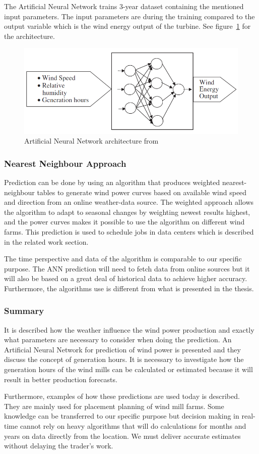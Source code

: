 The Artificial Neural Network trains 3-year dataset containing the mentioned input parameters. The input parameters are during the training compared to the output variable which is the wind energy output of the turbine. See figure~\ref{fig:annArchitecture} for the architecture.
\\[0.5cm]
\begin{figure}[h!]
\centering
\includegraphics[width=0.7\linewidth,natwidth=898,natheight=587]{billeder/ANNwindSpeedPrediction.png}
\caption{Artificial Neural Network architecture from \cite{WindPowerGenerationUsingANN}}
\label{fig:annArchitecture}
\end{figure}

\subsubsection{Nearest Neighbour Approach}
Prediction can be done by using an algorithm that produces weighted nearest-neighbour tables to generate wind power curves based on available wind speed and direction from an online weather-data source. The weighted approach allows the algorithm to adapt to seasonal changes by weighting newest results highest, and the power curves makes it possible to use the algorithm on different wind farms. This prediction is used to schedule jobs in data centers which is described in the related work section.

The time perspective and data of the algorithm is comparable to our specific purpose. The ANN prediction will need to fetch data from online sources but it will also be based on a great deal of historical data to achieve higher accuracy. Furthermore, the algorithms use is different from what is presented in the thesis. 

\subsubsection{Summary}
It is described how the weather influence the wind power production and exactly what parameters are necessary to consider when doing the prediction. An Artificial Neural Network for prediction of wind power is presented and they discuss the concept of generation hours. It is necessary to investigate how the generation hours of the wind mills can be calculated or estimated because it will result in better production forecasts. 

Furthermore, examples of how these predictions are used today is described. They are mainly used for placement planning of wind mill farms. Some knowledge can be transferred to our specific purpose but decision making in real-time cannot rely on heavy algorithms that will do calculations for months and years on data directly from the location. We must deliver accurate estimates without delaying the trader's work. 